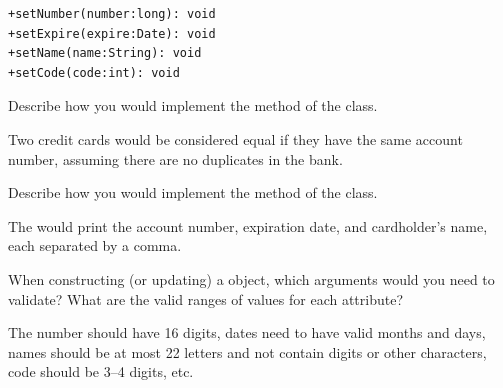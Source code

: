 \begin{answer}[5em]
\begin{verbatim}
+setNumber(number:long): void
+setExpire(expire:Date): void
+setName(name:String): void
+setCode(code:int): void
\end{verbatim}
\end{answer}


\Q \label{key3}
Describe how you would implement the  method of the  class.

\begin{answer}
Two credit cards would be considered equal if they have the same account number, assuming there are no duplicates in the bank.
\end{answer}


\Q Describe how you would implement the  method of the  class.

\begin{answer}
The  would print the account number, expiration date, and cardholder's name, each separated by a comma.
\end{answer}


\Q When constructing (or updating) a  object, which arguments would you need to validate?
What are the valid ranges of values for each attribute?

\begin{answer}[5em]
The number should have 16 digits, dates need to have valid months and days, names should be at most 22 letters and not contain digits or other characters, code should be 3--4 digits, etc.
\end{answer}
